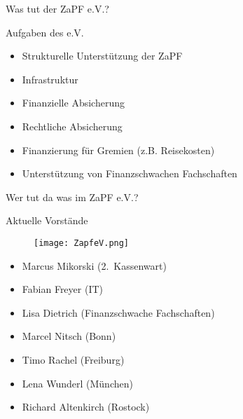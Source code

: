 \documentclass[compress, aspectratio=169]{beamer}
\begin{document}
\begin{frame}{Was tut der ZaPF e.V.?}
  \begin{block}{Aufgaben des e.V.}
    \begin{itemize}
      \item Strukturelle Unterstützung der ZaPF
      \item Infrastruktur
      \item Finanzielle Absicherung
      \item Rechtliche Absicherung
      \item Finanzierung für Gremien (z.B. Reisekosten)
      \item Unterstützung von Finanzschwachen Fachschaften
    \end{itemize}
  \end{block}
\end{frame}
  
\begin{frame}{Wer tut da was im ZaPF e.V.?}
  \begin{block}{Aktuelle Vorstände}
    \begin{minipage}{0.5\textwidth}
      \begin{figure}
      \texttt{[image: ZapfeV.png]}
      \end{figure}
    \end{minipage}
    \begin{minipage}{0.45\textwidth}
      \begin{itemize}
        \item Marcus Mikorski \mbox{(2. Kassenwart)}
        \item Fabian Freyer (IT)
        \item Lisa Dietrich (Finanzschwache Fachschaften)
        \item Marcel Nitsch (Bonn)
        \item Timo Rachel (Freiburg)
        \item Lena Wunderl (München)
        \item Richard Altenkirch (Rostock)
      \end{itemize}
    \end{minipage}
  \end{block}
\end{frame}
  
\end{document}
